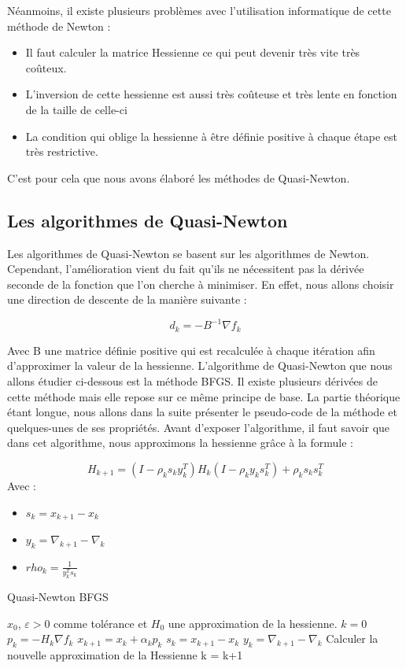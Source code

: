 Néanmoins, il existe plusieurs problèmes avec l'utilisation informatique de cette méthode de Newton : 
\begin{itemize}
	\item Il faut calculer la matrice Hessienne ce qui peut devenir très vite très coûteux.
	\item L'inversion de cette hessienne est aussi très coûteuse et très lente en fonction de la taille de celle-ci
	\item La condition qui oblige la hessienne à être définie positive à chaque étape est très restrictive. 
\end{itemize}
C'est pour cela que nous avons élaboré les méthodes de Quasi-Newton.
\subsection{Les algorithmes de Quasi-Newton}
Les algorithmes de Quasi-Newton se basent sur les algorithmes de Newton. Cependant, l'amélioration vient du fait qu'ils ne nécessitent pas la dérivée seconde de la fonction que l'on cherche à minimiser. En effet, nous allons choisir une direction de descente de la manière suivante : 

\begin{equation}
d_k = -B^{-1}\nabla f_k
\end{equation}

Avec B une matrice définie positive qui est recalculée à chaque itération afin d'approximer la valeur de la hessienne. L'algorithme de Quasi-Newton que nous allons étudier ci-dessous est  la méthode BFGS. Il existe plusieurs dérivées de cette méthode mais elle repose sur ce même principe de base. La partie théorique étant longue, nous allons dans la suite présenter le pseudo-code de la méthode et quelques-unes de ses propriétés. Avant d'exposer l'algorithme, il faut savoir que dans cet algorithme, nous approximons la hessienne grâce à la formule : 

\begin{equation}
H_{k+1} = (I - \rho_ks_ky_k^T)H_k(I-\rho_ky_ks_k^T)+ \rho_ks_ks_k^T
\end{equation}
Avec : 
\begin{itemize}
	\item $s_k = x_{k+1} - x_k$
	\item $y_k = \nabla_{k+1} - \nabla_k$
	\item $rho_k = \frac{1}{y_k^T s_k}$
\end{itemize}

\begin{algorithm}[H]
	\caption{Quasi-Newton BFGS}
	\begin{algorithmic}[1]
		\Require $x_0$, $\varepsilon > 0$ comme tolérance et $H_0$ une approximation de la hessienne.
		\State  $k  =0$
		\State $p_k = -H_k\nabla f_k$
		\State $x_{k+1} = x_{k} + \alpha_k p_k$
		\State $s_k = x_{k+1} - x_k$
		\State $y_k = \nabla_{k+1} - \nabla_k$
		\State Calculer la nouvelle approximation de la Hessienne
		\State k = k+1
		\EndWhile
		
	\end{algorithmic}
\end{algorithm}

